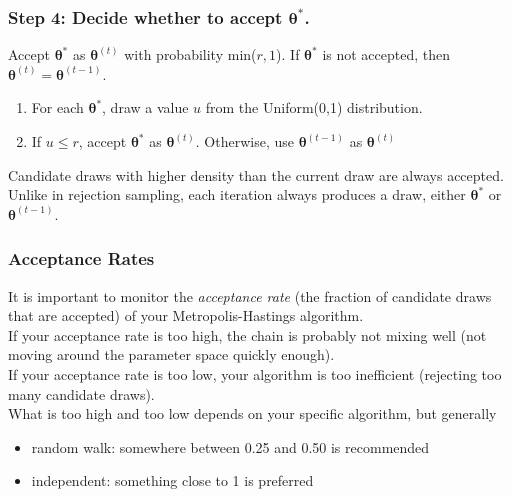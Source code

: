 \documentclass{beamer}
\begin{document}
\begin{frame}
\frametitle{Step 4: Decide whether to accept $\bm{\theta}^*$.}
\pause
Accept $\bm{\theta}^*$ as $\bm{\theta}^{(t)}$ with probability
min($r,1$).  If $\bm{\theta}^*$ is not accepted, then
$\bm{\theta}^{(t)} = \bm{\theta}^{(t-1)}$. \\
\bigskip
\pause
\begin{enumerate}
\item For each $\bm{\theta}^*$, draw a value $u$ from the Uniform(0,1)
distribution.
\pause
\item If $u \le r$, accept $\bm{\theta}^*$ as $\bm{\theta}^{(t)}$.
Otherwise, use $\bm{\theta}^{(t-1)}$ as $\bm{\theta}^{(t)}$
\end{enumerate}
\pause
\bigskip
Candidate draws with higher density than the current draw are always accepted.\\
\bigskip
\pause
Unlike in rejection sampling, each iteration always produces a draw,
either $\bm{\theta}^*$ or $\bm{\theta}^{(t-1)}$.
\end{frame}

\begin{frame}
\frametitle{Acceptance Rates}
\pause
It is important to monitor the \textit{acceptance rate} (the fraction of
candidate draws that are accepted) of your Metropolis-Hastings algorithm.\\
\pause
\bigskip
If your acceptance rate is too high, the chain is probably not mixing
well (not moving around the parameter space quickly enough).\\
\pause
\bigskip
If your acceptance rate is too low, your algorithm is too inefficient
(rejecting too many candidate draws).\\
\pause
\bigskip
What is too high and too low depends on your specific algorithm, but generally
\pause
\begin{itemize}
\item random walk: somewhere between 0.25 and 0.50 is recommended
\pause
\item independent: something close to 1 is preferred
\end{itemize}
\end{frame}
\end{document}
